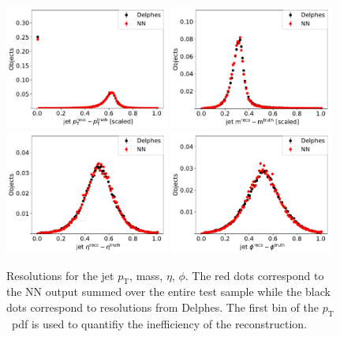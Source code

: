 \documentclass[showpacs,showkeys,preprint,prd,nofootinbib,linenumbers,12pt]{revtex4-1}
\def\pt{\ensuremath{p_{\mathrm{T}}}}
\begin{document}
\begin{figure}[htb]
  \includegraphics[width=0.48\textwidth]{jet_pTRes.pdf}
  \includegraphics[width=0.48\textwidth]{jet_mRes.pdf}\\
  \includegraphics[width=0.48\textwidth]{jet_etaRes.pdf}
  \includegraphics[width=0.48\textwidth]{jet_phiRes.pdf}
  \caption{Resolutions for the jet \pt, mass, $\eta$, $\phi$. The red dots correspond to the NN output summed over the entire test sample while the black dots correspond to resolutions from Delphes. The first bin of the \pt\ pdf is used to quantifiy the inefficiency of the reconstruction. }
  \label{fig:nnRes}
\end{figure}
\end{document}
